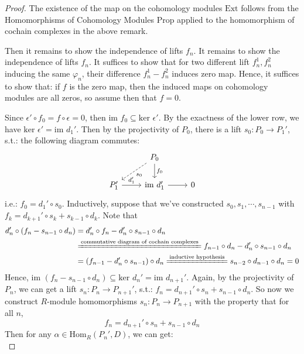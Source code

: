 \begin{proof}
    The existence of the map on the cohomology modules $\text{Ext}$ follows from the Homomorphisms of Cohomology Modules Prop applied to the homomorphism of cochain complexes in the above remark.

    Then it remains to show the independence of lifts $f_n$. It remains to show the independence of lifts $f_n$. It suffices to show that for two different lift $f_n^1 ,f_n^2$ inducing the same $\varphi_n$, their difference $f_n^1-f_n^2$ induces zero map. Hence, it suffices to show that: if $f$ is the zero map, then the induced maps on cohomology modules are all zeros, so assume then that $f=0$.

    Since $\epsilon' \circ f_0=f\circ \epsilon=0$, then $\text{im }f_0 \subseteq \text{ker }\epsilon'$. By the exactness of the lower row, we have $\text{ker }\epsilon' =\text{im }d_1'$. Then by the projectivity of $P_0$, there is a lift $s_0: P_0\to P_1'$, s.t.: the following diagram commutes:
    \[
    \begin{tikzcd}
        &P_0 \arrow[dl, dashed, "s_0"] \arrow[d, "f_0"]\\
        P_1' \arrow[r, "d_1'"] &\text{im }d_1' \arrow[r] &0
    \end{tikzcd}
    \]
    i.e.: $f_0= d_1' \circ s_0$. Inductively, suppose that we've constructed $s_0,s_1 ,\cdots ,s_{n-1}$ with $f_k= d_{k+1}' \circ s_k+ s_{k-1} \circ d_k$. Note that
    \begin{align*}
        d_n' \circ (f_n-s_{n-1} \circ d_n)&= d_n'\circ f_n- d_n' \circ s_{n-1} \circ d_n \\
        &\xlongequal{\text{commutative diagram of cochain complexes}} f_{n-1} \circ d_n- d_n' \circ s_{n-1} \circ d_n\\
        &=(f_{n-1} -d_n'\circ s_{n-1}) \circ d_n \xlongequal{\text{inductive hypothesis}} s_{n-2} \circ d_{n-1} \circ d_n=0
    \end{align*}
    Hence, $\text{im }(f_n- s_{n-1} \circ d_n) \subseteq \text{ker }d_n'= \text{im }d_{n+1}'$. Again, by the projectivity of $P_n$, we can get a lift $s_n:P_n \to P_{n+1}'$, s.t.: $f_n= d_{n+1}' \circ s_n + s_{n-1} \circ d_n$. So now we construct $R$-module homomorphisms $s_n: P_n\to P_{n+1}$ with the property that for all $n$,
    \begin{equation*}
        f_n=d_{n+1}' \circ s_n +s_{n-1} \circ d_n \tag{*}
    \end{equation*}
    Then for any $\alpha \in \text{Hom}_R (P_n',D)$, we can get:
    \begin{equation*}

\end{equation*}
\end{proof}

